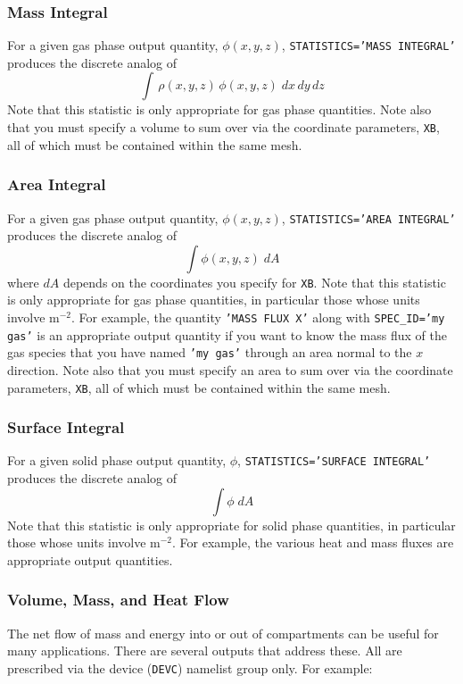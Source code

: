 \documentclass[11pt]{book}
\newcommand{\ct}{\tt\small}
\newcommand{\be}{\begin{equation}}
\newcommand{\ee}{\end{equation}}
\begin{document}
\subsubsection{Mass Integral}

For a given gas phase output quantity, $\phi(x,y,z)$, {\ct STATISTICS='MASS INTEGRAL'} produces the discrete analog of
\be \int \, \rho(x,y,z) \, \phi(x,y,z) \; dx \, dy \, dz \ee
Note that this statistic is only appropriate for gas phase quantities. Note also that you must specify a volume to sum over via the
coordinate parameters, {\ct XB}, all of which must be contained within the same mesh.

\subsubsection{Area Integral}

For a given gas phase output quantity, $\phi(x,y,z)$, {\ct STATISTICS='AREA INTEGRAL'} produces the discrete analog of
\be \int \phi(x,y,z) \; dA \ee
where $dA$ depends on the coordinates you specify for {\ct XB}.
Note that this statistic is only appropriate for gas phase quantities, in particular those whose units involve m$^{-2}$. For example,
the quantity {\ct 'MASS FLUX X'} along with {\ct SPEC\_ID='my gas'} is an appropriate output quantity if you want to know the mass flux of the gas species that
you have named {\ct 'my gas'} through an
area normal to the $x$ direction. Note also that you must specify an area to sum over via the
coordinate parameters, {\ct XB}, all of which must be contained within the same mesh.

\subsubsection{Surface Integral}

For a given solid phase output quantity, $\phi$, {\ct STATISTICS='SURFACE INTEGRAL'} produces the discrete analog of
\be \int \phi \; dA \ee
Note that this statistic is only appropriate for solid phase quantities, in particular those whose units involve m$^{-2}$. For example, the various heat and mass
fluxes are appropriate output quantities.


\subsubsection{Volume, Mass, and Heat Flow}
\label{info:flows}

The net flow of mass and energy into or out of compartments can be useful for many applications. There are several outputs that address these. All are prescribed via
the device ({\ct DEVC}) namelist group only. For example:
\end{document}
